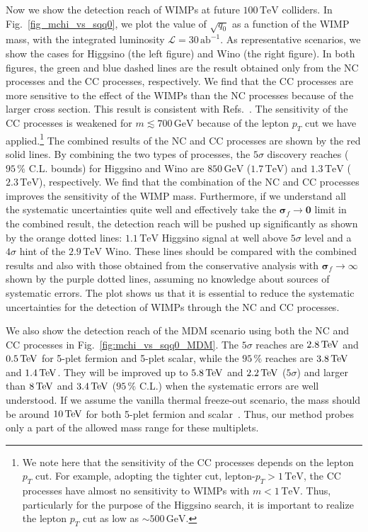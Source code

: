 \documentclass[12pt,twoside,book]{article}
\begin{document}
Now we show the detection reach of WIMPs at future $100\,\mathrm{TeV}$ colliders.
In Fig.~\ref{fig_mchi_vs_sqq0}, we plot the value of $\sqrt{q_0}$ as a function of the WIMP mass, with the integrated luminosity $\mathcal{L}=30\,\mathrm{ab}^{-1}$.
As representative scenarios, we show the cases for Higgsino (the left figure) and Wino (the right figure).
In both figures, the green and blue dashed lines are the result obtained only from the NC processes and the CC processes, respectively.
We find that the CC processes are more sensitive to the effect of the WIMPs than the NC processes because of the larger cross section.
This result is consistent with Refs.~\cite{DiLuzio:2018jwd,Matsumoto:2018ioi}.
The sensitivity of the CC processes is weakened for $m \lesssim 700\, \mathrm{GeV}$ because of the lepton $p_T$ cut we have applied.\footnote
{
  We note here that the sensitivity of the CC processes depends on the lepton $p_T$ cut.
  For example, adopting the tighter cut, lepton-$p_T > 1\,\mathrm{TeV}$, the CC processes have almost no sensitivity to WIMPs with $m < 1\,\mathrm{TeV}$.
  Thus, particularly for the purpose of the Higgsino search, it is important to realize the lepton $p_T$ cut as low as $\sim 500\, \mathrm{GeV}$.
}
The combined results of the NC and CC processes are shown by the red solid lines.
By combining the two types of processes, the $5\sigma$ discovery reaches ($95\,\%$ C.L. bounds) for Higgsino and Wino are $850\,\mathrm{GeV}$ ($1.7\,\mathrm{TeV}$) and $1.3\,\mathrm{TeV}$ ($2.3\,\mathrm{TeV}$), respectively.
We find that the combination of the NC and CC processes improves the sensitivity of the WIMP mass.
Furthermore, if we understand all the systematic uncertainties quite well and effectively take the $\bm{\sigma}_f \to \bm{0}$ limit in the combined result, the detection reach will be pushed up significantly as shown by the orange dotted lines: $1.1\,\mathrm{TeV}$ Higgsino signal at well above $5\sigma$ level and a $4\sigma$ hint of the $2.9\,\mathrm{TeV}$ Wino.
These lines should be compared with the combined results and also with those obtained from the conservative analysis with $\bm{\sigma}_f \to \infty$ shown by the purple dotted lines, assuming no knowledge about sources of systematic errors.
The plot shows us that it is essential to reduce the systematic uncertainties for the detection of WIMPs through the NC and CC processes.

We also show the detection reach of the MDM scenario using both the NC and CC processes in Fig.~\ref{fig:mchi_vs_sqq0_MDM}.
The $5\sigma$ reaches are $2.8\,{\rm TeV}$ and $0.5\,{\rm TeV}$ for 5-plet fermion and 5-plet scalar, while the $95\,\%$ reaches are $3.8\,{\rm TeV}$ and $1.4\,{\rm TeV}$.
They will be improved up to $5.8\,{\rm TeV}$ and $2.2\,{\rm TeV}$ ($5\sigma$) and larger than $8\,{\rm TeV}$ and $3.4\,{\rm TeV}$ ($95\,\%$ C.L.) when the systematic errors are well understood.
If we assume the vanilla thermal freeze-out scenario, the mass should be around $10\,{\rm TeV}$ for both 5-plet fermion and scalar~\cite{Cirelli:2007xd}.
Thus, our method probes only a part of the allowed mass range for these multiplets.
\end{document}
